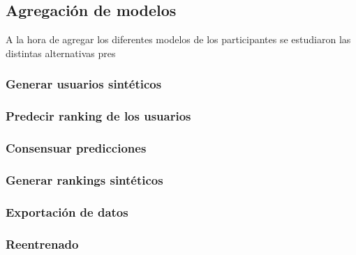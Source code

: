 \subsection{Agregación de modelos}\label{Consenso}
A la hora de agregar los diferentes modelos de los participantes se estudiaron las distintas alternativas pres
\subsubsection{Generar usuarios sintéticos}\label{Consenso:Usuarios_Sinteticos}


\subsubsection{Predecir ranking de los usuarios}

\subsubsection{Consensuar predicciones}

\subsubsection{Generar rankings sintéticos}

\subsubsection{Exportación de datos}

\subsubsection{Reentrenado}